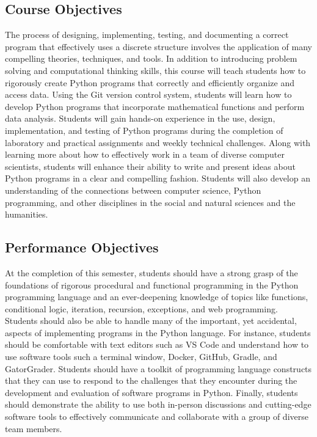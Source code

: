 \documentclass[11pt]{article}
\begin{document}
\subsection*{Course Objectives}

The process of designing, implementing, testing, and documenting a correct
program that effectively uses a discrete structure involves the application of
many compelling theories, techniques, and tools. In addition to introducing
problem solving and computational thinking skills, this course will teach
students how to rigorously create Python programs that correctly and
efficiently organize and access data. Using the Git version control system,
students will learn how to develop Python programs that incorporate
mathematical functions and perform data analysis.
%
Students will gain hands-on experience in the use, design, implementation, and
testing of Python programs during the completion of laboratory and practical
assignments and weekly technical challenges. Along with learning more about how
to effectively work in a team of diverse computer scientists, students will
enhance their ability to write and present ideas about Python programs in a
clear and compelling fashion. Students will also develop an understanding of
the connections between computer science, Python programming, and other
disciplines in the social and natural sciences and the humanities.

\subsection*{Performance Objectives}

At the completion of this semester, students should have a strong grasp of the
foundations of rigorous procedural and functional programming in the Python
programming language and an ever-deepening knowledge of topics like functions,
conditional logic, iteration, recursion, exceptions, and web programming.
Students should also be able to handle many of the important, yet accidental,
aspects of implementing programs in the Python language. For instance, students
should be comfortable with text editors such as VS Code and understand how to
use software tools such a terminal window, Docker, GitHub, Gradle, and
GatorGrader. Students should have a toolkit of programming language constructs
that they can use to respond to the challenges that they encounter during the
development and evaluation of software programs in Python. Finally, students
should demonstrate the ability to use both in-person discussions and
cutting-edge software tools to effectively communicate and collaborate with a
group of diverse team members.
\end{document}
